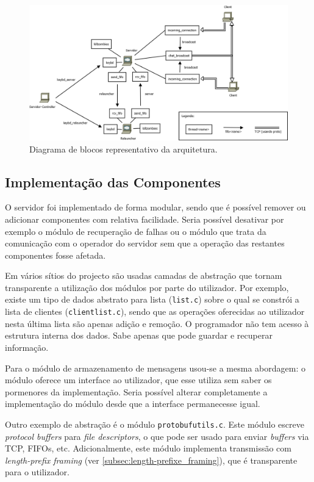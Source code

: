 \documentclass[a4paper]{article}
\begin{document}
	\begin{figure}[h]
		\centering
		\includegraphics[width=\textwidth]{img/architecture}
		\caption{Diagrama de blocos representativo da arquitetura.}
		\label{fig:architecture}
	\end{figure}


	\subsection{Implementação das Componentes}

	O servidor foi implementado de forma modular, sendo que é possível remover ou adicionar componentes com relativa facilidade. Seria possível desativar por exemplo o módulo de recuperação de falhas ou o módulo que trata da comunicação com o operador do servidor sem que a operação das restantes componentes fosse afetada.

	Em vários sítios do projecto são usadas camadas de abstração que tornam transparente a utilização dos módulos por parte do utilizador. Por exemplo, existe um tipo de dados abstrato para lista (\texttt{list.c}) sobre o qual se constrói a lista de clientes (\texttt{clientlist.c}), sendo que as operações oferecidas ao utilizador nesta última lista são apenas adição e remoção. O programador não tem acesso à estrutura interna dos dados. Sabe apenas que pode guardar e recuperar informação.

	Para o módulo de armazenamento de mensagens usou-se a mesma abordagem: o módulo oferece um interface ao utilizador, que esse utiliza sem saber os pormenores da implementação. Seria possível alterar completamente a implementação do módulo desde que a interface permanecesse igual.

	Outro exemplo de abstração é o módulo \texttt{protobufutils.c}. Este módulo escreve \textit{protocol buffers} para \textit{file descriptors}, o que pode ser usado para enviar \textit{buffers} via TCP, FIFOs, etc. Adicionalmente, este módulo implementa transmissão com \textit{length-prefix framing} (ver \autoref{subsec:length-prefixe_framing}), que é transparente para o utilizador.
\end{document}

